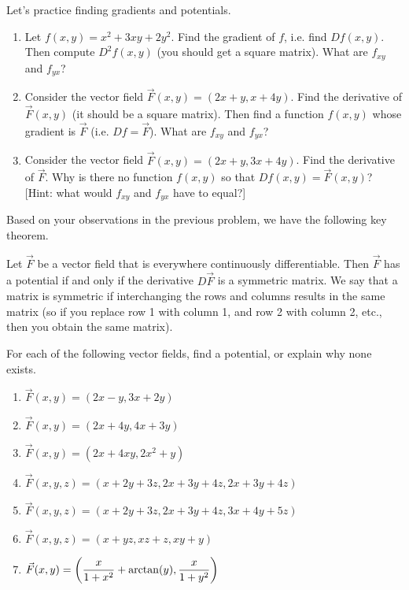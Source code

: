 \begin{problem}
%
Let's practice finding gradients and potentials.
\begin{enumerate}
 \item  Let $f(x,y) = x^2+3xy+2y^2$. Find the gradient of $f$, i.e. find $Df(x,y)$. Then compute $D^2f(x,y)$ (you should get a square matrix). What are $f_{xy}$ and $f_{yx}$?
 \item Consider the vector field $\vec F(x,y)=(2x+y,x+4y)$. Find the derivative of $\vec F(x,y)$ (it should be a square matrix). Then find a function $f(x,y)$ whose gradient is $\vec F$ (i.e. $Df=\vec F$). What are $f_{xy}$ and $f_{yx}$?
 \item {}%
Consider the vector field $\vec F(x,y)=(2x+y,3x+4y)$.  Find the derivative of $\vec F$.  Why is there no function $f(x,y)$ so that $Df(x,y)=\vec F(x,y)$? [Hint: what would $f_{xy}$ and $f_{yx}$ have to equal?] 
\end{enumerate}
\end{problem}

Based on your observations in the previous problem, we have the following key theorem.

\begin{theorem}
 Let $\vec F$ be a vector field that is everywhere continuously differentiable. Then $\vec F$ has a potential if and only if the derivative $D\vec F$ is a symmetric matrix. We say that a matrix is symmetric if interchanging the rows and columns results in the same matrix (so if you replace row 1 with column 1, and row 2 with column 2, etc., then you obtain the same matrix).  
\end{theorem}

\begin{problem}
%
For each of the following vector fields, find a potential, or explain why none exists.
\begin{enumerate}
 \item $\vec F(x,y)=(2x-y, 3x+2y)$
 \item $\vec F(x,y)=(2x+4y, 4x+3y)$
 \item $\vec F(x,y)=(2x+4xy, 2x^2+y)$
 \item $\vec F(x,y,z)=(x+2y+3z,2x+3y+4z,2x+3y+4z)$
 \item $\vec F(x,y,z)=(x+2y+3z,2x+3y+4z,3x+4y+5z)$
 \item $\vec F(x,y,z)=(x+yz,xz+z,xy+y)$
 \item $\displaystyle \vec F(x,y) = \left(\frac{x}{1+x^2}+\arctan (y),\frac{x}{1+y^2}\right)$
\end{enumerate}
\end{problem}



